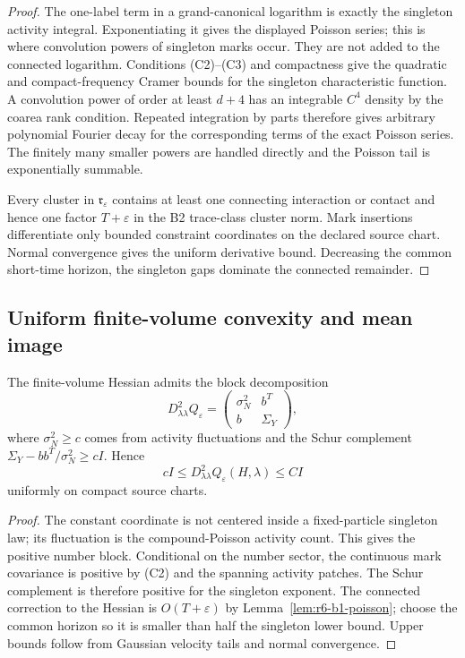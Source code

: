 \begin{proof}
The one-label term in a grand-canonical logarithm is exactly the singleton
activity integral.  Exponentiating it gives the displayed Poisson series; this
is where convolution powers of singleton marks occur.  They are not added to
the connected logarithm.  Conditions (C2)--(C3) and compactness give the
quadratic and compact-frequency Cramer bounds for the singleton characteristic
function.  A convolution power of order at least \(d+4\) has an integrable
\(C^4\) density by the coarea rank condition.  Repeated integration by parts
therefore gives arbitrary polynomial Fourier decay for the corresponding
terms of the exact Poisson series.  The finitely many smaller powers are
handled directly and the Poisson tail is exponentially summable.

Every cluster in \(\mathfrak r_\varepsilon\) contains at least one connecting
interaction or contact and hence one factor \(T+\varepsilon\) in the B2
trace-class cluster norm.  Mark insertions differentiate only bounded
constraint coordinates on the declared source chart.  Normal convergence
gives the uniform derivative bound.  Decreasing the common short-time
horizon, the singleton gaps dominate the connected remainder.
\end{proof}

\subsection{Uniform finite-volume convexity and mean image}

\begin{lemma}
\label{lem:r6-b1-covariance}
The finite-volume Hessian admits the block decomposition
\[
D^2_{\lambda\lambda}Q_\varepsilon=
\begin{pmatrix}
\sigma_N^2&b^T\\b&\Sigma_Y
\end{pmatrix},
\]
where \(\sigma_N^2\ge c\) comes from activity fluctuations and the Schur
complement
\(\Sigma_Y-bb^T/\sigma_N^2\ge cI\).  Hence
\[
cI\le D^2_{\lambda\lambda}Q_\varepsilon(H,\lambda)
\le CI
\]
uniformly on compact source charts.
\end{lemma}

\begin{proof}
The constant coordinate is not centered inside a fixed-particle singleton
law; its fluctuation is the compound-Poisson activity count.  This gives the
positive number block.  Conditional on the number sector, the continuous
mark covariance is positive by (C2) and the spanning activity patches.  The
Schur complement is therefore positive for the singleton exponent.  The
connected correction to the Hessian is \(O(T+\varepsilon)\) by
Lemma~\ref{lem:r6-b1-poisson}; choose the common horizon so it is smaller than
half the singleton lower bound.  Upper bounds follow from Gaussian velocity
tails and normal convergence.
\end{proof}

